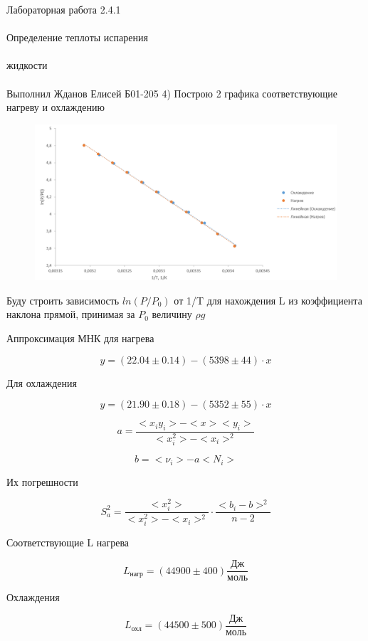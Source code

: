 \documentclass{astroedu-lab}
\begin{document}
\begin{problem}{\huge Лабораторная работа 2.4.1\\\\Определение теплоты испарения\\\\жидкости\\\\Выполнил Жданов Елисей Б01-205}
4) Построю 2 графика соответствующие нагреву и охлаждению

\begin{figure}[!h]
	\centering
	\includegraphics[width=1\textwidth]{график.png}
	\label{fig:boiler}
\end{figure}

Буду строить зависимость $ln(P/P_0)$ от 1/T для нахождения L из коэффициента наклона прямой, принимая за $P_0$ величину $\rho g$

Аппроксимация МНК для нагрева

\begin{equation}
	y = (22.04 \pm 0.14) - (5398 \pm 44) \cdot x
\end{equation}

Для охлаждения

\begin{equation}
	y = (21.90 \pm 0.18) - (5352 \pm 55) \cdot x
\end{equation}

\[
	a = \frac{<x_i y_i> - < x > < y_i >}{< x_i^2> - < x_i >^2}
\]

\[
	b = < \nu_i > - a < N_i >
\]

Их погрешности

\begin{equation}
	S_a^2 = \frac{< x_i^2>}{< x_i^2 > - < x_i >^2} \cdot \frac{<  b_i - b > ^2}{n - 2}
\end{equation}

Соответствующие L нагрева

\begin{equation}
	L_\text{нагр} = (44900 \pm 400) \frac{\text{Дж}}{\text{моль}}
\end{equation}

Охлаждения

\begin{equation}
	L_\text{охл} = (44500 \pm 500) \frac{\text{Дж}}{\text{моль}}
\end{equation}


\end{problem}
\end{document}
